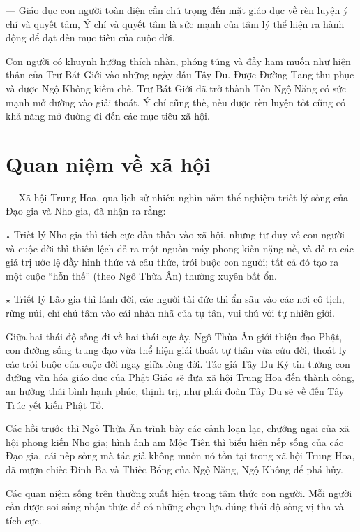 — Giáo dục con người toàn diện cần chú trọng đến mặt giáo dục về rèn luyện ý chí và quyết tâm, Ý chí và quyết tâm là sức mạnh của tâm lý thể hiện ra hành dộng để đạt đến mục tiêu của cuộc đời.

Con người có khuynh hướng thích nhàn, phóng túng và đầy ham muốn như hiện thân của Trư Bát Giới vào những ngày đầu Tây Du. Được Đường Tăng thu phục và được Ngộ Không kiềm chế, Trư Bát Giới đã trở thành Tôn Ngộ Năng có sức mạnh mở đường vào giải thoát. Ý chí cũng thế, nếu được rèn luyện tốt cũng có khả năng mở đường đi đến các mục tiêu xã hội.

\section{Quan niệm về xã hội} %
\label{sec:64_xa_hoi}

— Xã hội Trung Hoa, qua lịch sử nhiều nghìn năm thể nghiệm triết lý sống của Đạo gia và Nho gia, đã nhận ra rằng:

$\star$ Triết lý Nho gia thì tích cực dấn thân vào xã hội, nhưng tư duy về con người và cuộc đời thì thiên lệch đẻ ra một nguồn máy phong kiến nặng nề, và đẻ ra các giá trị ước lệ đầy hình thức và câu thức, trói buộc con người; tất cả đó tạo ra một cuộc ``hỗn thế'' (theo Ngô Thừa Ân) thường xuyên bất ổn.

$\star$ Triết lý Lão gia thì lánh đời, các người tài đức thì ẩn sâu vào các nơi cô tịch, rừng núi, chỉ chú tâm vào cái nhàn nhã của tự tân, vui thú với tự nhiên giới.

Giữa hai thái độ sống đi về hai thái cực ấy, Ngô Thừa Ân giới thiệu đạo Phật, con đường sống trung đạo vừa thể hiện giải thoát tự thân vừa cứu đời, thoát ly các trói buộc của cuộc đời ngay giữa lòng đời. Tác giả Tây Du Ký tin tưởng con đường văn hóa giáo dục của Phật Giáo sẽ đưa xã hội Trung Hoa đến thành công, an hưởng thái bình hạnh phúc, thịnh trị, như phái đoàn Tây Du sẽ về đến Tây Trúc yết kiến Phật Tổ.

Các hồi trước thì Ngô Thừa Ân trình bày các cảnh loạn lạc, chướng ngại của xã hội phong kiến Nho gia; hình ảnh am Mộc Tiên thì biểu hiện nếp sống của các Đạo gia, cái nếp sống mà tác giả không muốn nó tồn tại trong xã hội Trung Hoa, đã mượn chiếc Đinh Ba và Thiếc Bổng của Ngộ Năng, Ngộ Không để phá hủy.

Các quan niệm sống trên thường xuất hiện trong tâm thức con người. Mỗi người cần được soi sáng nhận thức để có những chọn lựa đúng thái độ sống vị tha và tích cực.
